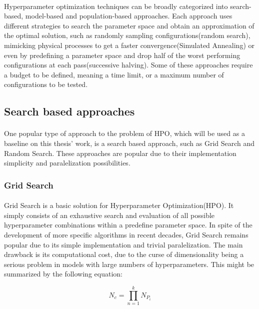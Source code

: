 \paragraph{}Hyperparameter optimization techniques can be broadly categorized into search-based, model-based and population-based approaches. Each approach uses different strategies to search the parameter space and obtain an approximation of the optimal solution, such as randomly sampling configurations(random search), mimicking physical processes to get a faster convergence(Simulated Annealing) or even by predefining a parameter space and drop half of the worst performing configurations at each pass(successive halving). Some of these approaches require a budget to be defined, meaning a time limit, or a maximum number of configurations to be tested.

\subsection{Search based approaches}
\paragraph{}One popular type of approach to the problem of HPO, which will be used as a baseline on this thesis' work, is a search based approach, such as Grid Search and Random Search. These approaches are popular due to their implementation simplicity and paralelization possibilities.
\subsubsection{Grid Search}
\paragraph{}Grid Search is a basic solution for Hyperparameter Optimization(HPO). It simply consists of an exhaustive search and evaluation of all possible hyperparameter combinations within a predefine parameter space\cite{yang2020hyperparameter}. In spite of the development of more specific algorithms in recent decades, Grid Search remains popular due to its simple implementation and trivial paralelization\cite{yang2020hyperparameter}. The main drawback is its computational cost, due to the curse of dimensionality being a serious problem in models with large numbers of hyperparameters\cite{yang2020hyperparameter}. This might be summarized by the following equation:

\begin{equation}
    N_c = \prod_{n=1}^{k} {N_{P_i}}
\end{equation}

